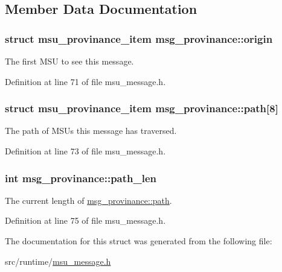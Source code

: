 \subsection{Member Data Documentation}
\hypertarget{structmsg__provinance_a974d9fb93121e018c61b38d884b11976}{
\subsubsection[{origin}]{\setlength{\rightskip}{0pt plus 5cm}struct {\bf msu\-\_\-provinance\-\_\-item} msg\-\_\-provinance\-::origin}}\label{structmsg__provinance_a974d9fb93121e018c61b38d884b11976}


The first M\-S\-U to see this message. 



Definition at line 71 of file msu\-\_\-message.\-h.

\hypertarget{structmsg__provinance_a34afbc25ce0a338c85a16c9c2cc313db}{
\subsubsection[{path}]{\setlength{\rightskip}{0pt plus 5cm}struct {\bf msu\-\_\-provinance\-\_\-item} msg\-\_\-provinance\-::path\mbox{[}8\mbox{]}}}\label{structmsg__provinance_a34afbc25ce0a338c85a16c9c2cc313db}


The path of M\-S\-Us this message has traversed. 



Definition at line 73 of file msu\-\_\-message.\-h.

\hypertarget{structmsg__provinance_af76b2286a3dd70ce44114aff1b3684a0}{
\subsubsection[{path\-\_\-len}]{\setlength{\rightskip}{0pt plus 5cm}int msg\-\_\-provinance\-::path\-\_\-len}}\label{structmsg__provinance_af76b2286a3dd70ce44114aff1b3684a0}


The current length of \hyperlink{structmsg__provinance_a34afbc25ce0a338c85a16c9c2cc313db}{msg\-\_\-provinance\-::path}. 



Definition at line 75 of file msu\-\_\-message.\-h.



The documentation for this struct was generated from the following file\-:\begin{DoxyCompactItemize}
\item 
src/runtime/\hyperlink{msu__message_8h}{msu\-\_\-message.\-h}\end{DoxyCompactItemize}
